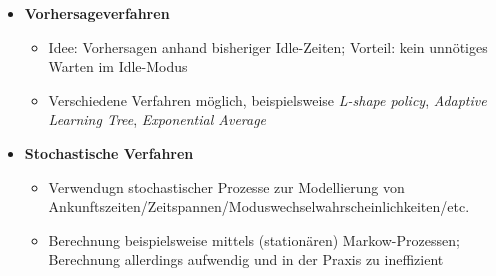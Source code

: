 \begin{itemize}
	\item \textbf{Vorhersageverfahren}
	\begin{itemize}
		\item Idee: Vorhersagen anhand bisheriger Idle-Zeiten; Vorteil: kein unnötiges Warten im Idle-Modus
		\item Verschiedene Verfahren möglich, beispielsweise \textit{L-shape policy}, \textit{Adaptive Learning Tree}, \textit{Exponential Average}
	\end{itemize}
	\item \textbf{Stochastische Verfahren}
	\begin{itemize}
		\item Verwendugn stochastischer Prozesse zur Modellierung von Ankunftszeiten/Zeitspannen/Moduswechselwahrscheinlichkeiten/etc.
		\item Berechnung beispielsweise mittels (stationären) Markow-Prozessen; Berechnung allerdings aufwendig und in der Praxis zu ineffizient
	\end{itemize}
\end{itemize}


